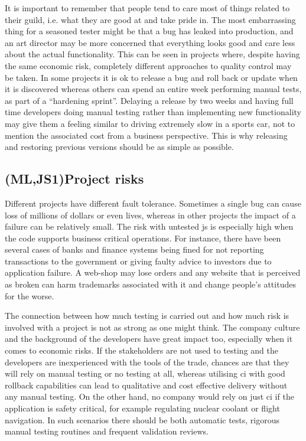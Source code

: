 \documentclass[11pt]{article}
\begin{document}
It is important to remember that people tend to care most of things related to their guild, i.e. what they are good at and take pride in. The most embarrassing thing for a seasoned tester might be that a bug has leaked into production, and an art director may be more concerned that everything looks good and care less about the actual functionality. This can be seen in projects where, despite having the same economic risk, completely different approaches to quality control may be taken. In some projects it is ok to release a bug and roll back or update when it is discovered whereas others can spend an entire week performing manual tests, as part of a ``hardening sprint''. Delaying a release by two weeks and having full time developers doing manual testing rather than implementing new functionality may give them a feeling similar to driving extremely slow in a sports car, not to mention the associated cost from a business perspective. This is why releasing and restoring previous versions should be as simple as possible. \cite[question~38]{Ahnve}

\subsection{(ML,JS1)Project risks}
\label{subsec:projectrisks}

Different projects have different fault tolerance. Sometimes a single bug can cause loss of millions of dollars or even lives, whereas in other projects the impact of a failure can be relatively small. The risk with untested \gls{js} is especially high when the code supports business critical operations. For instance, there have been several cases of banks and finance systems being fined for not reporting transactions to the government \cite{Bug1} or giving faulty advice to investors \cite{Bug2} due to application failure. A web-shop may lose orders and any website that is perceived as broken can harm trademarks associated with it and change people's attitudes for the worse.

The connection between how much testing is carried out and how much risk is involved with a project is not as strong as one might think. The company culture and the background of the developers have great impact too, especially when it comes to economic risks. If the stakeholders are not used to testing and the developers are inexperienced with the tools of the trade, chances are that they will rely on manual testing or no testing at all, whereas utilising \gls{ci} with good rollback capabilities can lead to qualitative and cost effective delivery without any manual testing. On the other hand, no company would rely on just \gls{ci} if the application is safety critical, for example regulating nuclear coolant or flight navigation. In such scenarios there should be both automatic tests, rigorous manual testing routines and frequent validation reviews. \cite[questions~14,~38]{Ahnve}
\end{document}
